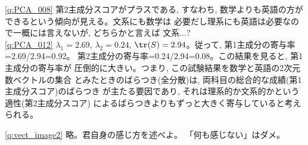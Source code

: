 \ref{q:PCA_008} 第2主成分スコアがプラスである, 
すなわち, 数学よりも英語の方ができるという傾向が見える。文系にも数学は
必要だし理系にも英語は必要なので一概には言えないが, どちらかと言えば
文系...?\\

\ref{q:PCA_012} $\lambda_1=2.69$, $\lambda_2=0.24$, 
$\tr(S)=2.94$。従って, 第1主成分の寄与率=2.69/2.94=0.92。
第2主成分の寄与率=0.24/2.94=0.08。この結果を見ると, 第1主成分の寄与率が
圧倒的に大きい。つまり, この試験結果を数学と英語の2次元数ベクトルの集合
とみたときのばらつき(全分散)は, 両科目の総合的な成績(第1主成分スコア)のばらつき
が主たる要因であり, それは理系的か文系的かという適性(第2主成分スコア)
によるばらつきよりもずっと大きく寄与していると考えられる。
\mv

\ref{q:vect_image2} 略。君自身の感じ方を述べよ。
「何も感じない」はダメ。
